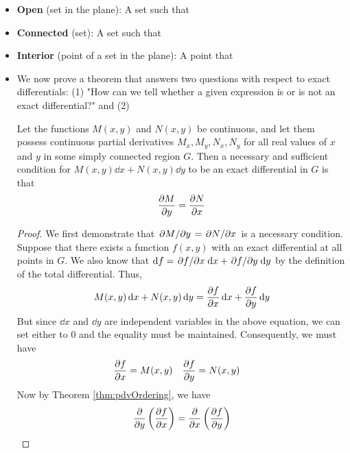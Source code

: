 \documentclass[../main.tex]{subfiles}
\begin{document}
\begin{itemize}
    \item \textbf{Open} (set in the plane): A set such that 
    \item \textbf{Connected} (set): A set such that 
    \item \textbf{Interior} (point of a set in the plane): A point that 
    \item We now prove a theorem that answers two questions with respect to exact differentials: (1) "How can we tell whether a given expression is or is not an exact differential?" and (2) 
    \begin{thm}\label{thm:exactDifferential}
        Let the functions $M(x,y)$ and $N(x,y)$ be continuous, and let them possess continuous partial derivatives $M_x,M_y,N_x,N_y$ for all real values of $x$ and $y$ in some simply connected region $G$. Then a necessary and sufficient condition for $M(x,y)\dd{x}+N(x,y)\dd{y}$ to be an exact differential in $G$ is that
        \begin{equation*}
            \pdv{M}{y} = \pdv{N}{x}
        \end{equation*}
        \begin{proof}
            We first demonstrate that $\pdv*{M}{y}=\pdv*{N}{x}$ is a necessary condition. Suppose that there exists a function $f(x,y)$ with an exact differential at all points in $G$. We also know that $\dd{f}=\pdv*{f}{x}\dd{x}+\pdv*{f}{y}\dd{y}$ by the definition of the total differential. Thus,
            \begin{equation*}
                M(x,y)\dd{x}+N(x,y)\dd{y} = \pdv{f}{x}\dd{x}+\pdv{f}{y}\dd{y}
            \end{equation*}
            But since $\dd{x}$ and $\dd{y}$ are independent variables in the above equation, we can set either to 0 and the equality must be maintained. Consequently, we must have
            \begin{align*}
                \pdv{f}{x} &= M(x,y)&
                    \pdv{f}{y} &= N(x,y)
            \end{align*}
            Now by Theorem \ref{thm:pdvOrdering}, we have
            \begin{equation*}
                \pdv{y}\left( \pdv{f}{x} \right) = \pdv{x}\left( \pdv{f}{y} \right)

\end{equation*}
\end{proof}
\end{thm}
\end{itemize}
\end{document}

